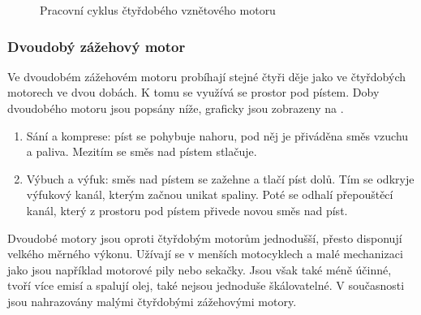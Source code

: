 \begin{figure}[H]
    
    \caption{Pracovní cyklus čtyřdobého vznětového motoru \jaDiag}
    \label{obr:PracovniCyklusCtyrdobehoVznetovehoMotoru}
\end{figure}

\newpage

\subsubsection{Dvoudobý zážehový motor}
{Ve dvoudobém zážehovém motoru probíhají stejné čtyři děje jako ve čtyřdobých motorech ve dvou dobách. K tomu se využívá se prostor pod pístem. Doby dvoudobého motoru jsou popsány níže, graficky jsou zobrazeny na .}
\cite{VUTB:DvoudobyMotorProParagliding}
\begin{enumerate}
    \item {Sání a komprese: píst se pohybuje nahoru, pod něj je přiváděna směs vzuchu a paliva. Mezitím se směs nad pístem stlačuje.}
    \item {Výbuch a výfuk: směs nad pístem se zažehne a tlačí píst dolů. Tím se odkryje výfukový kanál, kterým začnou unikat spaliny. Poté se odhalí přepouštěcí kanál, který z prostoru pod pístem přivede novou směs nad píst.}
\end{enumerate}
{Dvoudobé motory jsou oproti čtyřdobým motorům jednodušší, přesto disponují velkého měrného výkonu. Užívají se v menších motocyklech a malé mechanizaci jako jsou například motorové pily nebo sekačky. Jsou však také méně účinné, tvoří více emisí a spalují olej, také nejsou jednoduše škálovatelné. V současnosti jsou nahrazovány malými čtyřdobými zážehovými motory.}
\cite{VUTB:DvoudobyMotorProParagliding}

